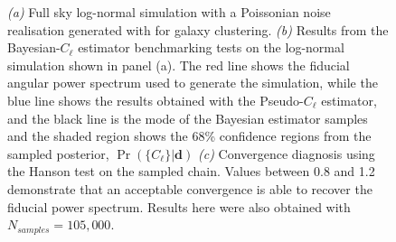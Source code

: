 \begin{figure}
\begin{subfigure}{.5\textwidth}
  \caption{}
\end{subfigure}
\caption[Bayesian-$C_{\ell}$ estimator tested on a full sky \flask log-normal simulation.]{\textit{(a)} Full sky log-normal simulation with a Poissonian noise realisation generated with \flask for galaxy clustering.  \textit{(b)} Results from the Bayesian-$C_{\ell}$ estimator benchmarking tests on the log-normal simulation shown in panel (a). The red line shows the fiducial angular power spectrum used to generate the simulation, while the blue line shows the results obtained with the Pseudo-$C_{\ell}$ estimator, and the black line is the mode of the Bayesian estimator samples and the shaded region shows the 68\% confidence regions from the sampled posterior, $\Pr (\{C_{\ell}\}|\mathbf{d})$ \textit{(c)} Convergence diagnosis using the Hanson test on the sampled chain. Values between 0.8 and 1.2 demonstrate that an acceptable convergence is able to recover the fiducial power spectrum. Results here were also obtained with $N_{samples} = 105,000$.}
\label{fig:BPL:LogNormalFSAnalysis}
\end{figure}


